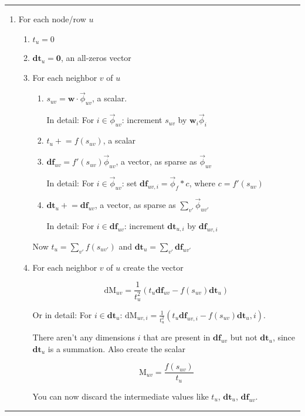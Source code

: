 \documentclass[12pt]{article}
\newcommand{\vek}[1]{\textbf{#1}}
\newcommand{\M}{\textrm{M}}
\newcommand{\dM}{\textrm{dM}}
\newcommand{\df}{\textbf{df}}
\newcommand{\dt}{\textbf{dt}}
\newcommand{\vphi}{\vec{\phi}}
\begin{document}
\begin{table} %
\hrule
\begin{enumerate}
\item For each node/row $u$
  \begin{enumerate}
  \item  $t_u = 0$
  \item  $\dt_u = \vek{0}$, an all-zeros vector
  \item For each neighbor $v$ of $u$
    \begin{enumerate}    
    \item $s_{uv} = \vek{w} \cdot \vphi_{uv}$,  a scalar.

      In detail: For $i\in \vphi_{uv}$: increment $s_{uv}$ by $\vek{w}_i\vphi_i$

    \item $t_u  +\!\!= f(s_{uv})$, a scalar
    \item $\df_{uv} = f'(s_{uv}) \vphi_{uv}$, a vector, as sparse as $\vphi_{uv}$

      In detail: For $i\in \vphi_{uv}$: set $\df_{uv,i} = \vphi_f * c$, where $c=f'(s_{uv})$

    \item  $\dt_u +\!\!= \df_{uv}$, a vector, as sparse as $\sum_{v'} \vphi_{uv'}$

      In detail: For $i\in \df_{uv}$: increment $\dt_{u,i}$ by $\df_{uv,i}$

    \end{enumerate}
  Now $t_u = \sum_{v'} f(s_{uv'})$ and $\dt_{u} = \sum_{v'} \df_{uv'}$
  \item For each neighbor $v$ of $u$ create the vector

\[ \dM_{uv}  = \frac{1}{t_u ^2} \left( t_u \df_{uv} - f(s_{uv}) \dt_u \right)  
\]

Or in detail: For $i\in\dt_u$: $\dM_{uv,i} = \frac{1}{t_u ^2} \left( t_u \df_{uv,i} - f(s_{uv}) \dt_u,i \right)$.  

There aren't any dimensions $i$ that are present in $\df_{uv}$ but not
$\dt_u$, since $\dt_u$ is a summation.  Also create the scalar

\[ \M_{uv}  = \frac{f(s_{uv})}{t_u} 
\]

  You can now discard the intermediate values like $t_u$, $\dt_u$, $\df_{uv}$.

  \end{enumerate}
\end{enumerate}
\caption{Computing $\M$ and $\dM$} \label{alg:mat}
\hrule
\end{table}
\end{document}
